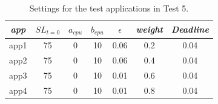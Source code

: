 \documentclass[nobiblatex]{LTHthesis}
\begin{document}
\begin{table}[h]
  \centering
  \begin{tabular}{|c|c|c|c|c|c|c|}
  \hline 
   \emph{app} & $SL_{t=0}$ & \textbf{$a_{cpu}$} & 
   \textbf{$b_{cpu}$} & \textbf{$\epsilon$} & 
   \emph{weight} & \emph{Deadline} \\ \hline
  app1 & 75 & 0 & 10 & 0.06 & 0.2 &0.04  \\ \hline
  app2 & 75 & 0 & 10 & 0.06 & 0.4 &0.04  \\ \hline
  app3 & 75 & 0 & 10 & 0.01 & 0.6 &0.04  \\ \hline
  app4 & 75 & 0 & 10 & 0.01 & 0.8 &0.04  \\ \hline        
  \end{tabular}
  \caption{Settings for the test applications in Test 5.}
  \label{tab:settings_test5}
\end{table}
\end{document}
